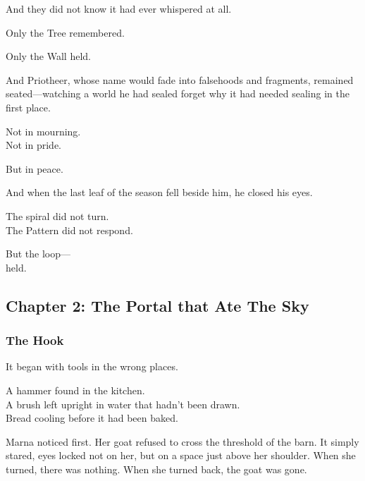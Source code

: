 \documentclass[12pt]{article}
\begin{document}
\vspace{0.5em}
And they did not know it had ever whispered at all.

\vspace{0.5em}
Only the Tree remembered.

\vspace{0.5em}
Only the Wall held.

\vspace{0.5em}
And Priotheer, whose name would fade into falsehoods and fragments, remained seated---watching a world he had sealed forget why it had needed sealing in the first place.

\vspace{0.5em}
Not in mourning.\\
Not in pride.

\vspace{0.5em}
But in peace.

\vspace{0.5em}
And when the last leaf of the season fell beside him, he closed his eyes.

\vspace{0.5em}
The spiral did not turn.\\
The Pattern did not respond.

\vspace{0.5em}
But the loop---\\
held.

\newpage

\subsection*{Chapter 2: The Portal that Ate The Sky}

\vspace{.5in}

\subsubsection*{The Hook}

It began with tools in the wrong places.

\vspace{0.5em}
A hammer found in the kitchen.\\
A brush left upright in water that hadn’t been drawn.\\
Bread cooling before it had been baked.

\vspace{0.5em}
Marna noticed first. Her goat refused to cross the threshold of the barn. It simply stared, eyes locked not on her, but on a space just above her shoulder. When she turned, there was nothing. When she turned back, the goat was gone.
\end{document}

